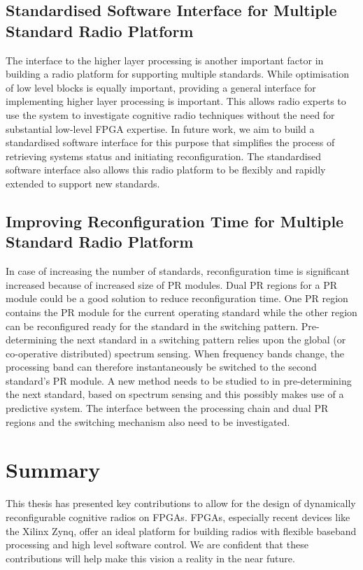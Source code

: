 \subsection{Standardised Software Interface for Multiple Standard Radio Platform}
The interface to the higher layer processing is another important factor in building a radio platform for supporting multiple standards.
While optimisation of low level blocks is equally important, providing a general interface for implementing higher layer processing is important.
This allows radio experts to use the system to investigate cognitive radio techniques without the need for substantial low-level FPGA expertise.
In future work, we aim to build a standardised software interface for this purpose that simplifies the process of retrieving systems status and initiating reconfiguration.
The standardised software interface also allows this radio platform to be flexibly and rapidly extended to support new standards.


\subsection{Improving Reconfiguration Time for Multiple Standard Radio Platform}
In case of increasing the number of standards, reconfiguration time is significant increased because of increased size of PR modules.
Dual PR regions for a PR module could be a good solution to reduce reconfiguration time.
One PR region contains the PR module for the current operating standard while the other region can be reconfigured ready for the standard in the switching pattern.
Pre-determining the next standard in a switching pattern relies upon the global (or co-operative distributed) spectrum sensing.
When frequency bands change, the processing band can therefore instantaneously be switched to the second standard's PR module.
A new method needs to be studied to in pre-determining the next standard, based on spectrum sensing and this possibly makes use of a predictive system.
The interface between the processing chain and dual PR regions and the switching mechanism also need to be investigated.

\section{Summary}

This thesis has presented key contributions to allow for the design of dynamically reconfigurable cognitive radios on FPGAs. FPGAs, especially recent devices like the Xilinx Zynq, offer an ideal platform for building radios with flexible baseband processing and high level software control. We are confident that these contributions will help make this vision a reality in the near future.
